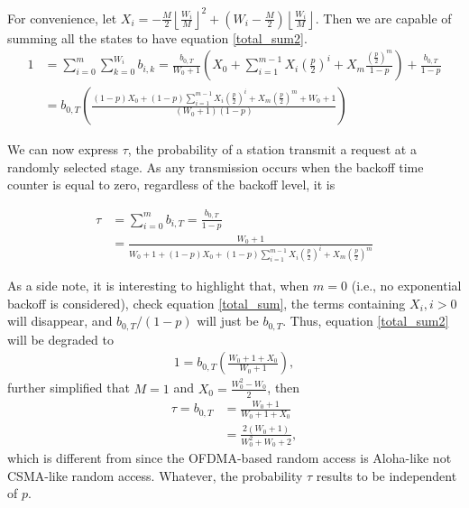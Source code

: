 For convenience, let $X_i = -\frac{M}{2}\left\lfloor \frac{W_i}{M}\right\rfloor ^2 + \left(W_i-\frac{M}{2}\right)\left\lfloor \frac{W_i}{M} \right\rfloor$. Then we are capable of summing all the states to have equation \ref{total_sum2}.
\begin{align}
1 &= \sum_{i=0}^m \sum_{k=0}^{W_i}b_{i,k} 
 = \frac{b_{0,T}}{W_0+1}\left( X_0 + \sum_{i=1}^{m-1}X_i\left( \frac{p}{2}\right)^i + X_m\frac{\left( \frac{p}{2}\right)^m}{1-p}\right) + \frac{b_{0,T}}{1-p}\label{total_sum}\\
& = b_{0,T}\left( \frac{(1-p)X_0+(1-p) \sum_{i=1}^{m-1}X_i\left( \frac{p}{2}\right)^i+X_m\left( \frac{p}{2}\right)^m+W_0+1}{(W_0+1)(1-p)}\right)\label{total_sum2}
\end{align}

We can now express $\tau$, the probability of a station transmit a request at a randomly selected stage.
As any transmission occurs when the backoff time counter is equal to zero, regardless of the backoff level, it is

\begin{align}
\label{tau_general}
\tau &= \sum_{i=0}^m b_{i,T} = \frac{b_{0,T}}{1-p}  \nonumber \\
 &=\frac{W_0+1}{W_0+1+(1-p)X_0+(1-p) \sum_{i=1}^{m-1}X_i\left( \frac{p}{2}\right)^i+X_m\left( \frac{p}{2}\right)^m}
\end{align}

As a side note, it is interesting to highlight that, when $m=0$ (i.e., no exponential backoff is considered), check equation \ref{total_sum}, the terms containing $X_i, i>0$ will disappear, and $b_{0,T}/(1-p)$ will just be $b_{0,T}$.
Thus, equation \ref{total_sum2} will be degraded to 
\begin{align}
1 = b_{0,T}\left( \frac{W_0+1+X_0}{W_0+1}\right),
\end{align}
further simplified that $M=1$ and $X_0=\frac{W_0^2-W_0}{2}$, then
\begin{align}
\tau = b_{0,T} &= \frac{W_0+1}{W_0+1+X_0} \nonumber\\
			   &= \frac{2(W_0+1)}{W_0^2+W_0+2},
\label{tau_W0}
\end{align}
which is different from \cite{ho1996performance} since the OFDMA-based random access is Aloha-like not CSMA-like random access. 
Whatever, the probability $\tau$ results to be independent of $p$.

